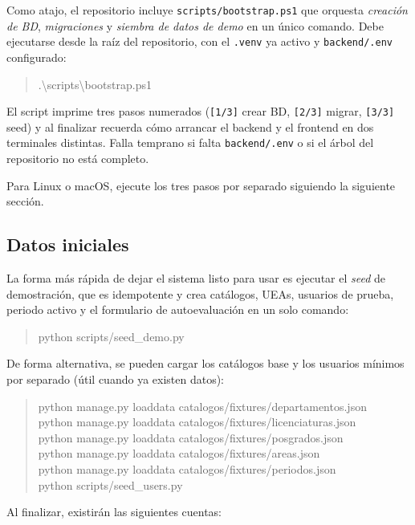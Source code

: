\documentclass{computacion}
\begin{document}
Como atajo, el repositorio incluye \texttt{scripts/bootstrap.ps1} que orquesta \emph{creación de BD}, \emph{migraciones} y \emph{siembra de datos de demo} en un único comando. Debe ejecutarse desde la raíz del repositorio, con el \texttt{.venv} ya activo y \texttt{backend/.env} configurado:

\begin{quote}
\ttfamily
.\textbackslash scripts\textbackslash bootstrap.ps1
\end{quote}

El script imprime tres pasos numerados (\texttt{[1/3]} crear BD, \texttt{[2/3]} migrar, \texttt{[3/3]} seed) y al finalizar recuerda cómo arrancar el backend y el frontend en dos terminales distintas. Falla temprano si falta \texttt{backend/.env} o si el árbol del repositorio no está completo.

Para Linux o macOS, ejecute los tres pasos por separado siguiendo la siguiente sección.

\subsection{Datos iniciales}

La forma más rápida de dejar el sistema listo para usar es ejecutar el \emph{seed} de demostración, que es idempotente y crea catálogos, UEAs, usuarios de prueba, periodo activo y el formulario de autoevaluación en un solo comando:

\begin{quote}
\ttfamily
python scripts/seed\_demo.py
\end{quote}

De forma alternativa, se pueden cargar los catálogos base y los usuarios mínimos por separado (útil cuando ya existen datos):

\begin{quote}
\ttfamily
python manage.py loaddata catalogos/fixtures/departamentos.json \\
python manage.py loaddata catalogos/fixtures/licenciaturas.json \\
python manage.py loaddata catalogos/fixtures/posgrados.json \\
python manage.py loaddata catalogos/fixtures/areas.json \\
python manage.py loaddata catalogos/fixtures/periodos.json \\
python scripts/seed\_users.py
\end{quote}

Al finalizar, existirán las siguientes cuentas:
\end{document}
